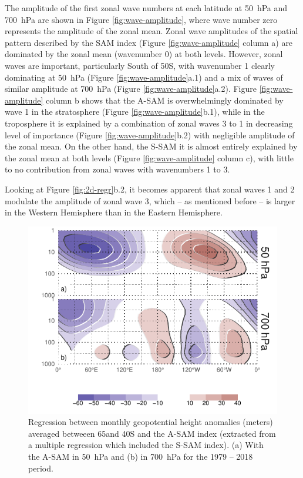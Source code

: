 \documentclass[smallextended]{svjour3}       %
\begin{document}
The amplitude of the first zonal wave numbers at each latitude at 50~hPa and 700~hPa are shown in Figure \ref{fig:wave-amplitude}, where wave number zero represents the amplitude of the zonal mean. Zonal wave amplitudes of the spatial pattern described by the SAM index (Figure \ref{fig:wave-amplitude} column a) are dominated by the zonal mean (wavenumber 0) at both levels. However, zonal waves are important, particularly South of 50\degree S, with wavenumber 1 clearly dominating at 50~hPa (Figure \ref{fig:wave-amplitude}a.1) and a mix of waves of similar amplitude at 700~hPa (Figure \ref{fig:wave-amplitude}a.2). Figure \ref{fig:wave-amplitude} column b shows that the A\nobreakdash-SAM is overwhelmingly dominated by wave 1 in the stratosphere (Figure \ref{fig:wave-amplitude}b.1), while in the troposphere it is explained by a combination of zonal waves 3 to 1 in decreasing level of importance (Figure \ref{fig:wave-amplitude}b.2) with negligible amplitude of the zonal mean. On the other hand, the S\nobreakdash-SAM it is almost entirely explained by the zonal mean at both levels (Figure \ref{fig:wave-amplitude} column c), with little to no contribution from zonal waves with wavenumbers 1 to 3.

Looking at Figure \ref{fig:2d-regr}b.2, it becomes apparent that zonal waves 1 and 2 modulate the amplitude of zonal wave 3, which -- as mentioned before -- is larger in the Western Hemisphere than in the Eastern Hemisphere.

\begin{figure}
\includegraphics{vertical-regression-1} \caption{Regression between monthly geopotential height anomalies (meters) averaged betweeen 65\degree and 40\degree S and the A\nobreakdash-SAM index (extracted from a multiple regression which included the S\nobreakdash-SAM index). (a) With the A\nobreakdash-SAM in 50~hPa and (b) in 700~hPa for the 1979 -- 2018 period.}\label{fig:vertical-regression}
\end{figure}
\end{document}

